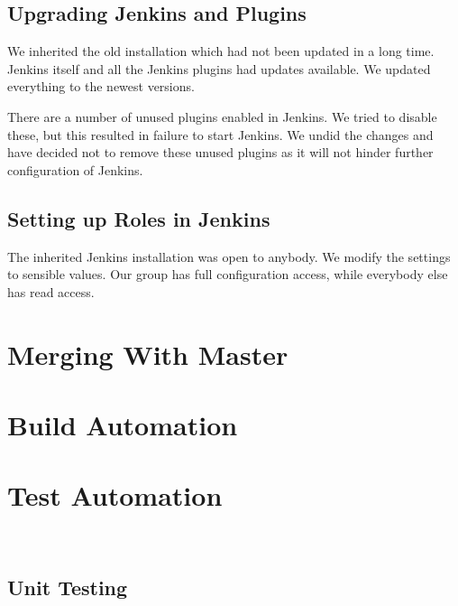 \subsection{Upgrading Jenkins and Plugins}
We inherited the old installation which had not been updated in a long time. Jenkins itself and all the Jenkins plugins had updates available. We updated everything to the newest versions.

There are a number of unused plugins enabled in Jenkins. We tried to disable these, but this resulted in failure to start Jenkins. We undid the changes and have decided not to remove these unused plugins as it will not hinder further configuration of Jenkins.

\subsection{Setting up Roles in Jenkins}
The inherited Jenkins installation was open to anybody. We modify the settings to sensible values. Our group has full configuration access, while everybody else has read access.

\section{Merging With Master}\label{sec:branching_strategy}

\section{Build Automation}\label{sec:build_automation}

\section{Test Automation}\label{sec:test_automation}
\dummy~\dummy~\dummy~
\subsection{Unit Testing}
\dummy~\dummy~\dummy~\dummy~\dummy~\dummy~
